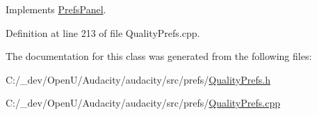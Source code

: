 Implements \hyperlink{class_prefs_panel_ab5572aedab201c47fbbdf714c6a2b781}{Prefs\+Panel}.



Definition at line 213 of file Quality\+Prefs.\+cpp.



The documentation for this class was generated from the following files\+:\begin{DoxyCompactItemize}
\item 
C\+:/\+\_\+dev/\+Open\+U/\+Audacity/audacity/src/prefs/\hyperlink{_quality_prefs_8h}{Quality\+Prefs.\+h}\item 
C\+:/\+\_\+dev/\+Open\+U/\+Audacity/audacity/src/prefs/\hyperlink{_quality_prefs_8cpp}{Quality\+Prefs.\+cpp}\end{DoxyCompactItemize}
